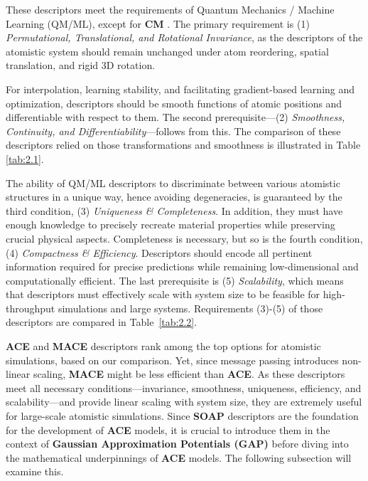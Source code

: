 These descriptors meet the requirements of Quantum Mechanics / Machine Learning (QM/ML), except for \textbf{CM} \cite{Musil2021, Langer2022}.
The primary requirement is (1) \textit{Permutational, Translational, and Rotational Invariance}, as the descriptors of the atomistic system should remain unchanged under atom reordering, spatial translation, and rigid 3D rotation.

For interpolation, learning stability, and facilitating gradient-based learning and optimization, descriptors should be smooth functions of atomic positions and differentiable with respect to them. 
The second prerequisite—(2) \textit{Smoothness, Continuity, and Differentiability}—follows from this.
The comparison of these descriptors relied on those transformations and smoothness is illustrated in Table \ref{tab:2.1}.

The ability of QM/ML descriptors to discriminate between various atomistic structures in a unique way, hence avoiding degeneracies, is guaranteed by the third condition, (3) \textit{Uniqueness \& Completeness}.
In addition, they must have enough knowledge to precisely recreate material properties while preserving crucial physical aspects.
Completeness is necessary, but so is the fourth condition, (4) \textit{Compactness \& Efficiency}. Descriptors should encode all pertinent information required for precise predictions while remaining low-dimensional and computationally efficient.
The last prerequisite is (5) \textit{Scalability}, which means that descriptors must effectively scale with system size to be feasible for high-throughput simulations and large systems.%
Requirements (3)-(5) of those descriptors are compared in Table~\ref{tab:2.2}.

\textbf{ACE} and \textbf{MACE} descriptors rank among the top options for atomistic simulations, based on our comparison.
Yet, since message passing introduces non-linear scaling, \textbf{MACE} might be less efficient than \textbf{ACE}.
As these descriptors meet all necessary conditions—invariance, smoothness, uniqueness, efficiency, and scalability—and provide linear scaling with system size, they are extremely useful for large-scale atomistic simulations.
Since \textbf{SOAP} descriptors are the foundation for the development of \textbf{ACE} models, it is crucial to introduce them in the context of \textbf{Gaussian Approximation Potentials (GAP)} before diving into the mathematical underpinnings of \textbf{ACE} models.
The following subsection will examine this.

